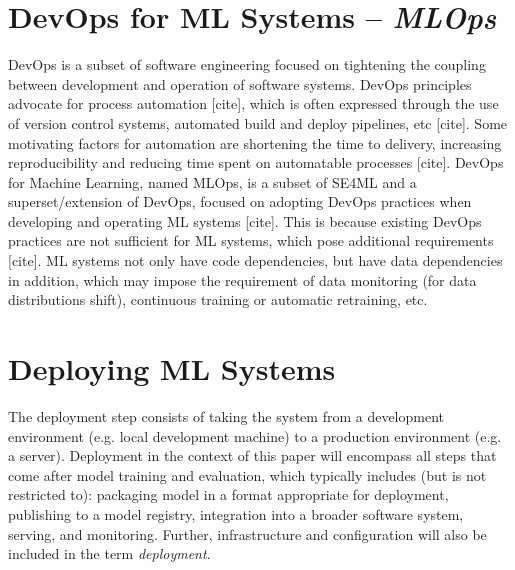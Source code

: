 \section{DevOps for ML Systems -- \emph{MLOps}}
DevOps is a subset of software engineering focused on tightening the coupling between development and operation of software systems.
DevOps principles advocate for process automation [cite], which is often expressed through the use of version control systems, automated build and deploy pipelines, etc [cite].
Some motivating factors for automation are shortening the time to delivery, increasing reproducibility and reducing time spent on automatable processes [cite].
DevOps for Machine Learning, named MLOps, is a subset of SE4ML and a superset/extension of DevOps, focused on adopting DevOps practices when developing and operating ML systems [cite].
This is because existing DevOps practices are not sufficient for ML systems, which pose additional requirements [cite].
ML systems not only have code dependencies, but have data dependencies in addition, which may impose the requirement of data monitoring (for data distributions shift), continuous training or automatic retraining, etc.

\section{Deploying ML Systems}
\label{sec:deploying_ml_systems}
The deployment step consists of taking the system from a development environment (e.g. local development machine) to a production environment (e.g. a server).
Deployment in the context of this paper will encompass all steps that come after model training and evaluation, which typically includes (but is not restricted to): packaging model in a format appropriate for deployment, publishing to a model registry, integration into a broader software system, serving, and monitoring.
Further, infrastructure and configuration will also be included in the term \emph{deployment}.
